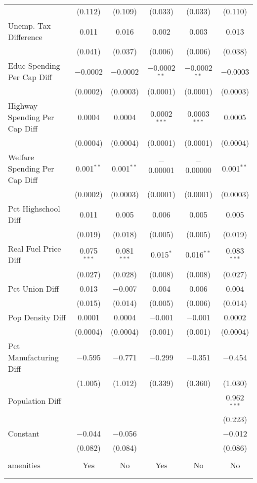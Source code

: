 \begin{table}[!htbp]
\begin{tabular}{@{\extracolsep{5pt}}lccccc}
  & (0.112) & (0.109) & (0.033) & (0.033) & (0.110) \\ 
  Unemp. Tax Difference & 0.011 & 0.016 & 0.002 & 0.003 & 0.013 \\ 
  & (0.041) & (0.037) & (0.006) & (0.006) & (0.038) \\ 
  Educ Spending Per Cap Diff & $-$0.0002 & $-$0.0002 & $-$0.0002$^{**}$ & $-$0.0002$^{**}$ & $-$0.0003 \\ 
  & (0.0002) & (0.0003) & (0.0001) & (0.0001) & (0.0003) \\ 
  Highway Spending Per Cap Diff & 0.0004 & 0.0004 & 0.0002$^{***}$ & 0.0003$^{***}$ & 0.0005 \\ 
  & (0.0004) & (0.0004) & (0.0001) & (0.0001) & (0.0004) \\ 
  Welfare Spending Per Cap Diff & 0.001$^{**}$ & 0.001$^{**}$ & $-$0.00001 & $-$0.00000 & 0.001$^{**}$ \\ 
  & (0.0002) & (0.0003) & (0.0001) & (0.0001) & (0.0003) \\ 
  Pct Highschool Diff & 0.011 & 0.005 & 0.006 & 0.005 & 0.005 \\ 
  & (0.019) & (0.018) & (0.005) & (0.005) & (0.019) \\ 
  Real Fuel Price Diff & 0.075$^{***}$ & 0.081$^{***}$ & 0.015$^{*}$ & 0.016$^{**}$ & 0.083$^{***}$ \\ 
  & (0.027) & (0.028) & (0.008) & (0.008) & (0.027) \\ 
  Pct Union Diff & 0.013 & $-$0.007 & 0.004 & 0.006 & 0.004 \\ 
  & (0.015) & (0.014) & (0.005) & (0.006) & (0.014) \\ 
  Pop Density Diff & 0.0001 & 0.0004 & $-$0.001 & $-$0.001 & 0.0002 \\ 
  & (0.0004) & (0.0004) & (0.001) & (0.001) & (0.0004) \\ 
  Pct Manufacturing Diff & $-$0.595 & $-$0.771 & $-$0.299 & $-$0.351 & $-$0.454 \\ 
  & (1.005) & (1.012) & (0.339) & (0.360) & (1.030) \\ 
  Population Diff &  &  &  &  & 0.962$^{***}$ \\ 
  &  &  &  &  & (0.223) \\ 
  Constant & $-$0.044 & $-$0.056 &  &  & $-$0.012 \\ 
  & (0.082) & (0.084) &  &  & (0.086) \\ 
 \hline \\[-1.8ex] 
amenities & Yes & No & Yes & No & No \\ 
\hline \\[-1.8ex] 
\hline 
\hline \\[-1.8ex] 
\end{tabular} 
\end{table} 
